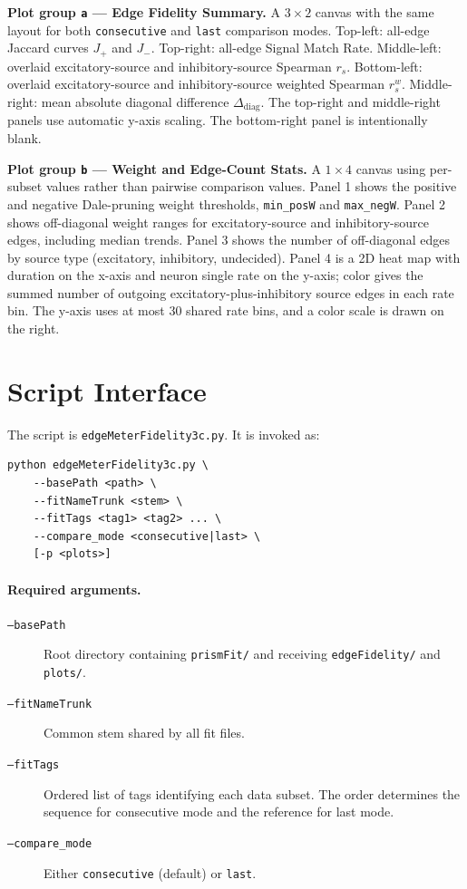 \documentclass[11pt]{article}
\begin{document}
\bigskip
\noindent\textbf{Plot group \texttt{a} --- Edge Fidelity Summary.}
A $3 \times 2$ canvas with the same layout for both \texttt{consecutive} and \texttt{last} comparison modes. Top-left: all-edge Jaccard curves $J_+$ and $J_-$. Top-right: all-edge Signal Match Rate. Middle-left: overlaid excitatory-source and inhibitory-source Spearman $r_s$. Bottom-left: overlaid excitatory-source and inhibitory-source weighted Spearman $r_s^w$. Middle-right: mean absolute diagonal difference $\Delta_{\text{diag}}$. The top-right and middle-right panels use automatic y-axis scaling. The bottom-right panel is intentionally blank.

\bigskip
\noindent\textbf{Plot group \texttt{b} --- Weight and Edge-Count Stats.}
A $1 \times 4$ canvas using per-subset values rather than pairwise comparison values. Panel 1 shows the positive and negative Dale-pruning weight thresholds, \texttt{min\_posW} and \texttt{max\_negW}. Panel 2 shows off-diagonal weight ranges for excitatory-source and inhibitory-source edges, including median trends. Panel 3 shows the number of off-diagonal edges by source type (excitatory, inhibitory, undecided). Panel 4 is a 2D heat map with duration on the x-axis and neuron single rate on the y-axis; color gives the summed number of outgoing excitatory-plus-inhibitory source edges in each rate bin. The y-axis uses at most 30 shared rate bins, and a color scale is drawn on the right.

\section{Script Interface}
\label{sec:cli}

The script is \texttt{edgeMeterFidelity3c.py}. It is invoked as:
\begin{verbatim}
python edgeMeterFidelity3c.py \
    --basePath <path> \
    --fitNameTrunk <stem> \
    --fitTags <tag1> <tag2> ... \
    --compare_mode <consecutive|last> \
    [-p <plots>]
\end{verbatim}

\paragraph{Required arguments.}
\begin{description}
    \item[\texttt{--basePath}] Root directory containing \texttt{prismFit/} and receiving \texttt{edgeFidelity/} and \texttt{plots/}.
    \item[\texttt{--fitNameTrunk}] Common stem shared by all fit files.
    \item[\texttt{--fitTags}] Ordered list of tags identifying each data subset. The order determines the sequence for consecutive mode and the reference for last mode.
    \item[\texttt{--compare\_mode}] Either \texttt{consecutive} (default) or \texttt{last}.
\end{description}
\end{document}
